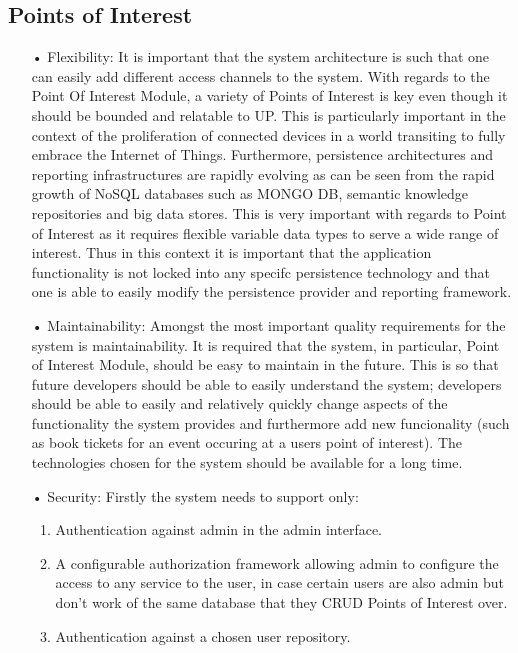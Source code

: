 \documentclass[runningheads,a4paper]{article}
\begin{document}
\subsection{Points of Interest}
\begin{enumerate}
\item[•]Flexibility: It is important that the system architecture is such that one can easily
add different access channels to the system. With regards to the Point Of Interest Module, a variety of Points of Interest is key even though it should be bounded and relatable to UP. This is particularly important in the context of the proliferation of connected devices in a world transiting to fully embrace the Internet of Things.
Furthermore, persistence architectures and reporting infrastructures are rapidly evolving as can
be seen from the rapid growth of NoSQL databases such as MONGO DB, semantic knowledge repositories and big data stores. This is very important with regards to Point of Interest as it requires flexible variable data types to serve a wide range of interest. Thus in this context it is important that the application functionality is not locked into any specifc persistence technology and that one is able to easily modify the persistence provider and reporting framework.

\item[•]Maintainability: Amongst the most important quality requirements for the system is maintainability. It is required that the system, in particular, Point of Interest Module, should be easy to maintain in the future. This is so that future developers should be able to easily understand the system; developers should be able to easily and relatively quickly change aspects of the functionality the system provides and furthermore add new funcionality (such as book tickets for an event occuring at a users point of interest).
The technologies chosen for the system should be available for a long time. 

\item[•]Security: Firstly the system needs to support only:
\begin{enumerate}
\item Authentication against admin in the admin interface.
\item A configurable authorization framework allowing admin to configure the access to any service to the user, in case certain users are also admin but don't work of the same database that they CRUD Points of Interest over. 
\item Authentication against a chosen user repository. 
\end{enumerate}


\end{enumerate}
\end{document}

